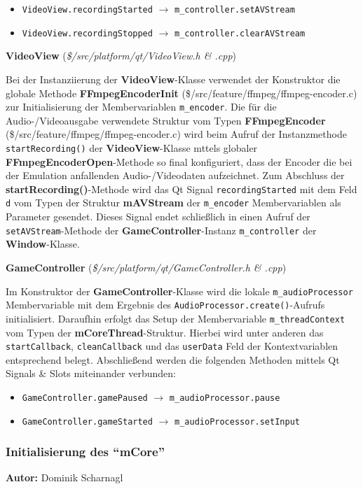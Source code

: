 \documentclass[11pt,a4paper]{scrartcl}
\newcommand{\AutorDominik} {
    \vspace{-4mm}
    \large \textbf{Autor:} Dominik Scharnagl \normalsize
    \vspace{2mm}
}
\newcommand{\paratitlecode}[2] {
    \vspace{5mm}
    \large \textbf{#1} \normalsize(\textit{\${#2}})
    \vspace{2mm}\newline
}
\begin{document}
\begin{itemize}
    \item \verb|VideoView.recordingStarted| $\rightarrow$ \verb|m_controller.setAVStream|
    \item \verb|VideoView.recordingStopped| $\rightarrow$ \verb|m_controller.clearAVStream|
\end{itemize}


\paratitlecode{VideoView}{/src/platform/qt/VideoView.h \& .cpp}
Bei der Instanziierung der \textbf{VideoView}-Klasse verwendet der Konstruktor die globale Methode \textbf{FFmpegEncoderInit} (\$/src/feature/ffmpeg/ffmpeg-encoder.c) zur Initialisierung der Membervariablen \verb|m_encoder|. Die f\"ur die Audio-/Videoausgabe verwendete Struktur vom Typen \textbf{FFmpegEncoder} (\$/src/feature/ffmpeg/ffmpeg-encoder.c) wird beim Aufruf der Instanzmethode \verb|startRecording()| der \textbf{VideoView}-Klasse mttels globaler \textbf{FFmpegEncoderOpen}-Methode so final konfiguriert, dass der Encoder die bei der Emulation anfallenden Audio-/Videodaten aufzeichnet. Zum Abschluss der \textbf{startRecording()}-Methode wird das Qt Signal \verb|recordingStarted| mit dem Feld \verb|d| vom Typen der Struktur \textbf{mAVStream} der \verb|m_encoder| Membervariablen als Parameter gesendet. Dieses Signal endet schlie{\ss}lich in einen Aufruf der \verb|setAVStream|-Methode der \textbf{GameController}-Instanz \verb|m_controller| der \textbf{Window}-Klasse.


\paratitlecode{GameController}{/src/platform/qt/GameController.h \& .cpp}
Im Konstruktor der \textbf{GameController}-Klasse wird die lokale \verb|m_audioProcessor| Membervariable mit dem Ergebnis des \verb|AudioProcessor.create()|-Aufrufs initialisiert. Daraufhin erfolgt das Setup der Membervariable \verb|m_threadContext| vom Typen der \textbf{mCoreThread}-Struktur. Hierbei wird unter anderen das \verb|startCallback|, \verb|cleanCallback| und das \verb|userData| Feld der Kontextvariablen entsprechend belegt. Abschlie{\ss}end werden die folgenden Methoden mittels Qt Signals \& Slots miteinander verbunden:

\begin{itemize}
    \item \verb|GameController.gamePaused| $\rightarrow$ \verb|m_audioProcessor.pause|
    \item \verb|GameController.gameStarted| $\rightarrow$ \verb|m_audioProcessor.setInput|
\end{itemize}

\newpage
\subsubsection{Initialisierung des \enquote{mCore}}
\AutorDominik
\end{document}

